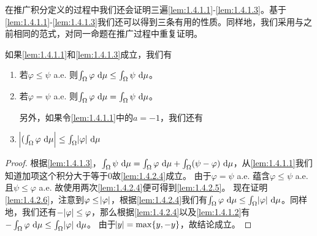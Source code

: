 \documentclass[../main.tex]{subfiles}
\begin{document}
在推广积分定义的过程中我们还会证明三遍\ref{lem:1.4.1.1}-\ref{lem:1.4.1.3}。基于\ref{lem:1.4.1.1}-\ref{lem:1.4.1.3}我们还可以得到三条有用的性质。同样地，我们采用与之前相同的范式，对同一命题在推广过程中重复证明。
\begin{lemma} \label{lem:1.4.2}
	如果\ref{lem:1.4.1.1}和\ref{lem:1.4.1.3}成立，我们有
	\begin{enumerate}[start=4]
		\item \label{lem:1.4.2.4} 若\(\varphi\leq\psi\) a.e. 则\(\int_\Omega\varphi\,\dif\mu\leq\int_\Omega\psi\,\dif\mu\)。
		\item \label{lem:1.4.2.5} 若\(\varphi=\psi\) a.e. 则\(\int_\Omega\varphi\,\dif\mu=\int_\Omega\psi\,\dif\mu\)。

		另外，如果令\ref{lem:1.4.1.1}中的\(a=-1\)，我们还有
		\item \label{lem:1.4.2.6} \(\envert{(\int_\Omega\varphi\,\dif\mu}\leq\int_\Omega\envert{\varphi}\,\dif\mu\)
	\end{enumerate}
\end{lemma}
\begin{proof}
	根据\ref{lem:1.4.1.3}，\(\int_\Omega\psi\,\dif\mu=\int_\Omega\varphi\,\dif\mu+\int_\Omega(\psi-\varphi)\,\dif\mu\)，从\ref{lem:1.4.1.1}我们知道加项这个积分大于等于\(0\)故\ref{lem:1.4.2.4}成立。
	由于\(\varphi=\psi\) a.e. 蕴含\(\varphi\leq\psi\) a.e. 且\(\psi\leq\varphi\) a.e. 故使用两次\ref{lem:1.4.2.4}便可得到\ref{lem:1.4.2.5}。
	现在证明\ref{lem:1.4.2.6}，注意到\(\varphi\leq\envert{\varphi}\)，根据\ref{lem:1.4.2.4}我们有\(\int_\Omega\varphi\,\dif\mu\leq\int_\Omega\envert{\varphi}\,\dif\mu\)。同样地，我们还有\(-\envert{\varphi}\leq\varphi\)，那么根据\ref{lem:1.4.2.4}以及\ref{lem:1.4.1.2}有\(-\int_\Omega\varphi\,\dif\mu\leq\int_\Omega\envert{\varphi}\,\dif\mu\)。
	由于\(\envert{y}=\max\{y,-y\}\)，故结论成立。
\end{proof}
\end{document}
